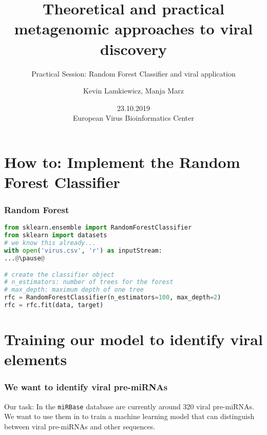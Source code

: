 

\title{Theoretical and practical metagenomic approaches to viral discovery}
\subtitle{Practical Session: Random Forest Classifier and viral application}
\author{Kevin Lamkiewicz, Manja Marz}
\date{23.10.2019\\[1em]European Virus Bioinformatics Center}



\begin{frame}
  \maketitle
\end{frame}

\section[Implementation]{How to: Implement the Random Forest Classifier}

\begin{frame}[c,fragile]\frametitle{Random Forest}
  \begin{lstlisting}[language=Python]
from sklearn.ensemble import RandomForestClassifier
from sklearn import datasets
# we know this already...
with open('virus.csv', 'r') as inputStream: 
...@\pause@

# create the classifier object
# n_estimators: number of trees for the forest
# max_depth: maximum depth of one tree
rfc = RandomForestClassifier(n_estimators=100, max_depth=2)
rfc = rfc.fit(data, target)
  \end{lstlisting}
\end{frame}


\section[Hands-On]{Training our model to identify viral elements}

\begin{frame}[c]\frametitle{We want to identify viral pre-miRNAs}
  \begin{block}{Our task:}
    In the \texttt{miRBase} database are currently around 320 viral pre-miRNAs.
    We want to use them in to train a machine learning model that can distinguish between
    viral pre-miRNAs and other sequences.
  \end{block}
  \vspace*{3em}
\end{frame}

